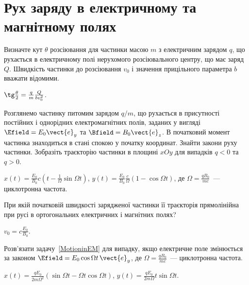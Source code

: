 \section{Рух заряду в електричному та магнітному полях}


\begin{problem}
    Визначте кут $\theta$ розсіювання для частинки масою $m$ з електричним зарядом $q$, що рухається в електричному полі нерухомого розсіювального центру, що має заряд $Q$. Швидкість частинки до розсіювання $v_0$ і значення прицільного параметра $b$ вважати відомими.
\begin{solution}
	$\tg\frac{\theta}{2} = \frac qm \frac{Q}{bv_0^2}$.
\end{solution}
\end{problem}

\begin{problem}\label{MotioninEM}
Розглянемо частинку питомим зарядом $q/m$, що рухається в присутності постійних і однорідних електромагнітних полів, заданих у вигляді $\Efield = E_0\vect{e}_y$ та $\Bfield = B_0\vect{e}_z$. В початковий момент частинка знаходиться в стані спокою у початку координат. Знайти закони руху частинки. Зобразіть траєкторію частинки в площині $xOy$ для випадків $q < 0$ та  $q> 0$.
\begin{solution}
	$x(t)  = \frac{E_0}{B_0}c\left( t - \frac{1}{\Omega}\sin\Omega t \right) $,
	$y(t)  = \frac{E_0}{B_0} \frac{c}{\Omega}\left( 1 - \cos\Omega t \right) $, де $\Omega = \frac{qB_0}{mc}$~--- циклотронна частота.
\end{solution}
\end{problem}

\begin{problem}
При якій початковій швидкості зарядженої частинки її траєкторія прямолінійна при русі в ортогональних електричних і магнітних полях?
\begin{solution}
	$v_0 = c\frac{E_0}{B_0}$.
\end{solution}
\end{problem}


\begin{problem}
Розв'язати задачу~\ref{MotioninEM} для випадку, якщо електричне поле змінюється за законом $\Efield = E_0\cos\Omega t\,\vect{e}_y$,  де $\Omega = \frac{qB_0}{mc}$~--- циклотронна частота.
\begin{solution}
	$x(t)  = \frac{qE_0}{2m\Omega^2}\left( \sin\Omega t - \Omega t\cos\Omega t \right) $,
	$y(t)  = \frac{qE_0}{2m\Omega}t\sin\Omega t$.
\end{solution}
\end{problem}


